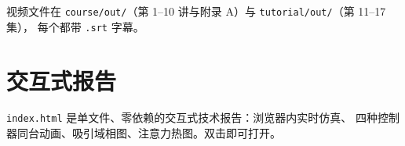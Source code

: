 \documentclass[UTF8,11pt,openany]{ctexbook}
\begin{document}
视频文件在 \texttt{course/out/}（第 1--10 讲与附录 A）与 \texttt{tutorial/out/}（第 11--17 集），
每个都带 \texttt{.srt} 字幕。

\section{交互式报告}

\texttt{index.html} 是单文件、零依赖的交互式技术报告：浏览器内实时仿真、
四种控制器同台动画、吸引域相图、注意力热图。双击即可打开。
\end{document}
